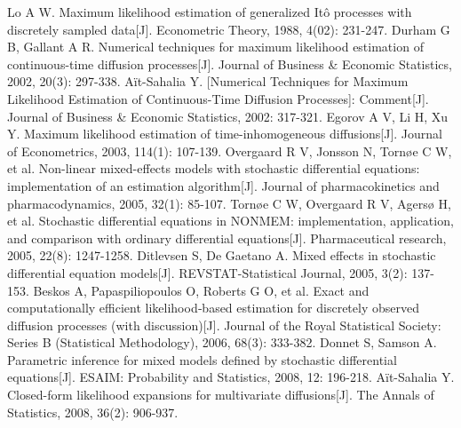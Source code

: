 \documentclass[12pt]{extarticle}
\begin{document}
\begin{thebibliography}{9}
Lo A W. Maximum likelihood estimation of generalized It{\^o} processes with discretely sampled data[J]. Econometric Theory, 1988, 4(02): 231-247.
Durham G B, Gallant A R. Numerical techniques for maximum likelihood estimation of continuous-time diffusion processes[J]. Journal of Business \& Economic Statistics, 2002, 20(3): 297-338.
A{\"i}t-Sahalia Y. [Numerical Techniques for Maximum Likelihood Estimation of Continuous-Time Diffusion Processes]: Comment[J]. Journal of Business \& Economic Statistics, 2002: 317-321.
Egorov A V, Li H, Xu Y. Maximum likelihood estimation of time-inhomogeneous diffusions[J]. Journal of Econometrics, 2003, 114(1): 107-139.
Overgaard R V, Jonsson N, Torn{\o}e C W, et al. Non-linear mixed-effects models with stochastic differential equations: implementation of an estimation algorithm[J]. Journal of pharmacokinetics and pharmacodynamics, 2005, 32(1): 85-107.
Torn{\o}e C W, Overgaard R V, Agers{\o} H, et al. Stochastic differential equations in NONMEM{\circledR}: implementation, application, and comparison with ordinary differential equations[J]. Pharmaceutical research, 2005, 22(8): 1247-1258.
Ditlevsen S, De Gaetano A. Mixed effects in stochastic differential equation models[J]. REVSTAT-Statistical Journal, 2005, 3(2): 137-153.
Beskos A, Papaspiliopoulos O, Roberts G O, et al. Exact and computationally efficient likelihood‐based estimation for discretely observed diffusion processes (with discussion)[J]. Journal of the Royal Statistical Society: Series B (Statistical Methodology), 2006, 68(3): 333-382.
Donnet S, Samson A. Parametric inference for mixed models defined by stochastic differential equations[J]. ESAIM: Probability and Statistics, 2008, 12: 196-218.
A{\"i}t-Sahalia Y. Closed-form likelihood expansions for multivariate diffusions[J]. The Annals of Statistics, 2008, 36(2): 906-937.
\end{thebibliography}
\end{document}
